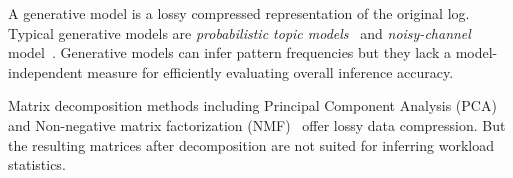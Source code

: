 A generative model is a lossy compressed representation of the original log.
Typical generative models are \textit{probabilistic topic models}~\cite{DBLP:journals/cacm/Blei12,DBLP:conf/acl/WangZLG09} and \textit{noisy-channel} model~\cite{DBLP:journals/ai/KnightM02}.
Generative models can infer pattern frequencies but they lack a model-independent measure for efficiently evaluating overall inference accuracy.

Matrix decomposition methods including Principal Component Analysis (PCA)~\cite{DBLP:reference/stat/Jolliffe11} and Non-negative matrix factorization (NMF)~\cite{lee1999learning} offer lossy data compression.
But the resulting matrices after decomposition are not suited for inferring workload statistics.

